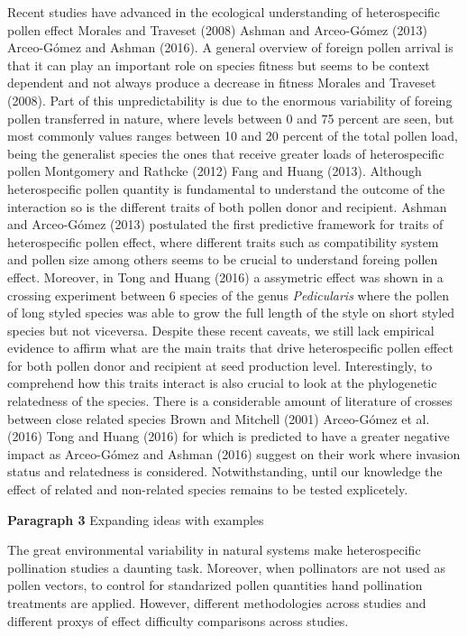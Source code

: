 \documentclass[11pt,a4paper]{article}
\begin{document}
Recent studies have advanced in the ecological understanding of
heterospecific pollen effect Morales and Traveset (2008) Ashman and
Arceo-Gómez (2013) Arceo-Gómez and Ashman (2016). A general overview of
foreign pollen arrival is that it can play an important role on species
fitness but seems to be context dependent and not always produce a
decrease in fitness Morales and Traveset (2008). Part of this
unpredictability is due to the enormous variability of foreing pollen
transferred in nature, where levels between 0 and 75 percent are seen,
but most commonly values ranges between 10 and 20 percent of the total
pollen load, being the generalist species the ones that receive greater
loads of heterospecific pollen Montgomery and Rathcke (2012) Fang and
Huang (2013). Although heterospecific pollen quantity is fundamental to
understand the outcome of the interaction so is the different traits of
both pollen donor and recipient. Ashman and Arceo-Gómez (2013)
postulated the first predictive framework for traits of heterospecific
pollen effect, where different traits such as compatibility system and
pollen size among others seems to be crucial to understand foreing
pollen effect. Moreover, in Tong and Huang (2016) a assymetric effect
was shown in a crossing experiment between 6 species of the genus
\emph{Pedicularis} where the pollen of long styled species was able to
grow the full length of the style on short styled species but not
viceversa. Despite these recent caveats, we still lack empirical
evidence to affirm what are the main traits that drive heterospecific
pollen effect for both pollen donor and recipient at seed production
level. Interestingly, to comprehend how this traits interact is also
crucial to look at the phylogenetic relatedness of the species. There is
a considerable amount of literature of crosses between close related
species Brown and Mitchell (2001) Arceo-Gómez et al. (2016) Tong and
Huang (2016) for which is predicted to have a greater negative impact as
Arceo-Gómez and Ashman (2016) suggest on their work where invasion
status and relatedness is considered. Notwithstanding, until our
knowledge the effect of related and non-related species remains to be
tested explicetely.

\textbf{Paragraph 3} Expanding ideas with examples

The great environmental variability in natural systems make
heterospecific pollination studies a daunting task. Moreover, when
pollinators are not used as pollen vectors, to control for standarized
pollen quantities hand pollination treatments are applied. However,
different methodologies across studies and different proxys of effect
difficulty comparisons across studies.
\end{document}

